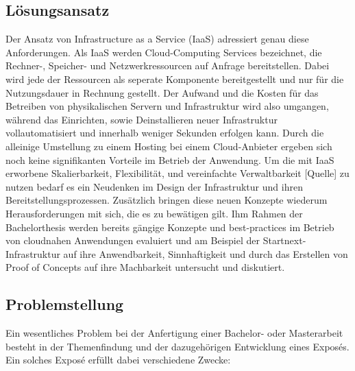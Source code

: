 \documentclass[11pt]{scrartcl}
\begin{document}
\subsection{Lösungsansatz}
Der Ansatz von Infrastructure as a Service (IaaS) adressiert genau diese Anforderungen.
Als IaaS werden Cloud-Computing Services bezeichnet, die Rechner-, Speicher- und Netzwerkressourcen auf Anfrage bereitstellen. Dabei wird jede der Ressourcen als seperate Komponente bereitgestellt und nur für die Nutzungsdauer in Rechnung gestellt. Der Aufwand und die Kosten für das Betreiben von physikalischen Servern und Infrastruktur wird also umgangen, während das Einrichten, sowie Deinstallieren neuer Infrastruktur vollautomatisiert und innerhalb weniger Sekunden erfolgen kann. Durch die alleinige Umstellung zu einem Hosting bei einem Cloud-Anbieter ergeben sich noch keine signifikanten Vorteile im Betrieb der Anwendung. Um die mit IaaS erworbene Skalierbarkeit, Flexibilität, und vereinfachte Verwaltbarkeit [Quelle] zu nutzen bedarf es ein Neudenken im Design der Infrastruktur und ihren Bereitstellungsprozessen. Zusätzlich bringen diese neuen Konzepte wiederum Herausforderungen mit sich, die es zu bewätigen gilt. \newline 
Ihm Rahmen der Bachelorthesis werden bereits g{\"a}ngige Konzepte und \glqq best-practices\grqq{} im Betrieb von cloudnahen Anwendungen evaluiert und am Beispiel der Startnext-Infrastruktur auf ihre Anwendbarkeit, Sinnhaftigkeit und durch das Erstellen von Proof of Concepts auf ihre Machbarkeit untersucht und diskutiert. 
\pagebreak
\subsection{Problemstellung}
Ein wesentliches Problem bei der Anfertigung einer Bachelor- oder Masterarbeit besteht in der Themenfindung und der dazugehörigen Entwicklung eines Exposés. Ein solches Exposé erfüllt dabei verschiedene Zwecke:
\end{document}
